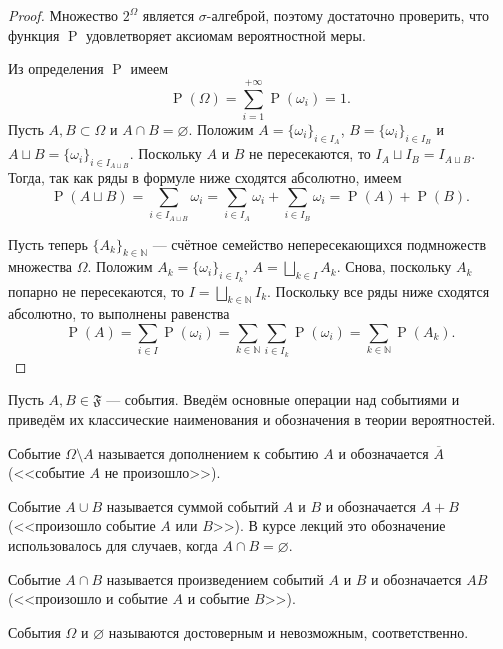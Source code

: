 \documentclass[12pt]{article}
\numberwithin{theorem}{section}
\theoremstyle{definition}
\newcommand{\defin}[2]{\hypertarget{#2}{{\color{red} #1}}}
\newcommand{\prob}{\operatorname{P}}
\newcommand{\events}{\mathfrak{F}}
\begin{document}
	\begin{proof}
		
		Множество $ 2^{\Omega} $ является $ \sigma $-алгеброй, поэтому достаточно проверить, что функция $ \prob $
		удовлетворяет аксиомам вероятностной меры.
		
		Из определения $ \prob $ имеем
		$$ \prob(\Omega) = \sum\limits_{i = 1}^{+\infty} \prob(\omega_i) = 1. $$
		Пусть $ A, B \subset \Omega $ и $ A \cap B = \varnothing $.
		Положим $ A = \{\omega_{i}\}_{i \in I_A} $, $ B = \{\omega_{i}\}_{i \in I_B} $ и 
		$ A \sqcup B = \{\omega_i\}_{i \in I_{A \sqcup B}} $. 
		Поскольку $ A $ и $ B $ не пересекаются, то $ I_A \sqcup I_B =  I_{A \sqcup B} $.
		Тогда, так как ряды в формуле ниже сходятся абсолютно, имеем
		$$ \prob(A \sqcup B) = \sum\limits_{i \in I_{A \sqcup B}} \omega_i = 
		\sum\limits_{i \in I_A} \omega_{i} + \sum\limits_{i \in I_B} \omega_{i}
		= \prob(A) + \prob(B). $$
		
		Пусть теперь $ \{A_k\}_{k \in \mathbb{N}} $ --- счётное семейство непересекающихся подмножеств множества $ \Omega $.
		Положим $ A_k = \{\omega_{i}\}_{i \in I_k} $, $ A = \bigsqcup\limits_{k \in I} A_k $.
		Снова, поскольку $ A_k $ попарно не пересекаются, то $ I = \bigsqcup\limits_{k \in \mathbb{N}} I_k $.
		Поскольку все ряды ниже сходятся абсолютно, то выполнены равенства
		$$ \prob(A) = \sum\limits_{i \in I} \prob(\omega_i) 
		= \sum\limits_{k \in \mathbb{N}} \sum\limits_{i \in I_k} \prob(\omega_i) 
		= \sum\limits_{k \in \mathbb{N}} \prob(A_k). $$
	\end{proof}
	
	Пусть $ A, B \in \events $ --- события. Введём основные операции над событиями 
	и приведём их классические наименования и обозначения в теории вероятностей. 
	
	Событие $ \Omega \setminus A $ называется
	\defin{дополнением к событию $ A $}{event-compl}
	и обозначается $ \overline{A} $ (<<событие $ A $ не произошло>>).
	
	Событие $ A \cup B $ называется
	\defin{суммой событий $ A $ и $ B $}{event-sum}
	и обозначается $ A + B $  (<<произошло событие $ A $ или $ B $>>). 
	В курсе лекций это обозначение использовалось для случаев, когда $ A \cap B = \varnothing $.
	
	Событие $ A \cap B $ называется 
	\defin{произведением событий $ A $ и $ B $}{event-product} 
	и обозначается $ AB $ (<<произошло и событие $ A $ и событие $ B $>>).
	
	События $ \Omega $ и $ \varnothing $ называются \defin{достоверным}{} и \defin{невозможным}{}, соответственно.
	
\end{document}
